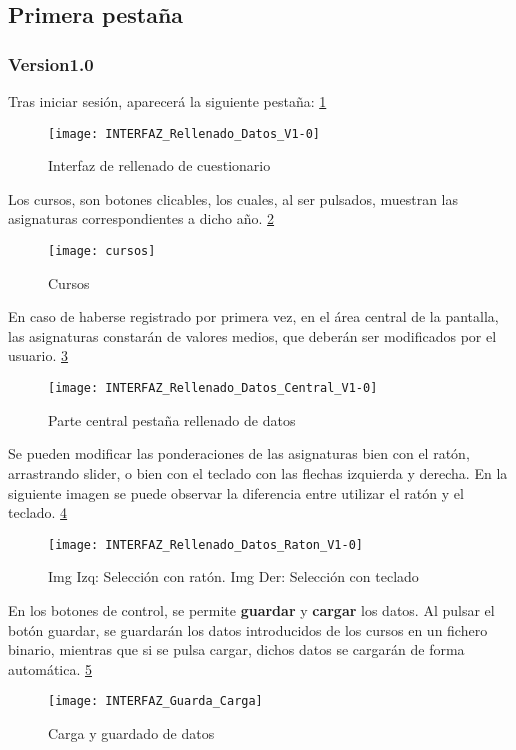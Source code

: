 \subsection{Primera pestaña}
\subsubsection{Version1.0}
Tras iniciar sesión, aparecerá la siguiente pestaña: \ref{fig:E.2.1}
\begin{figure}[h]
\centering
\texttt{[image: INTERFAZ\_Rellenado\_Datos\_V1-0]}
\caption{Interfaz de rellenado de cuestionario}
\label{fig:E.2.1}
\end{figure}
Los cursos, son botones clicables, los cuales, al ser pulsados, muestran las asignaturas correspondientes a dicho año. \ref{fig:E.2.2}
\begin{figure}[h]
\centering
\texttt{[image: cursos]}
\caption{Cursos}
\label{fig:E.2.2}
\end{figure}

En caso de haberse registrado por primera vez, en el área central de la pantalla, las asignaturas constarán de valores medios, que deberán ser modificados por el usuario. \ref{fig:E.2.3}
\begin{figure}[h]
\centering
\texttt{[image: INTERFAZ\_Rellenado\_Datos\_Central\_V1-0]}
\caption{Parte central pestaña rellenado de datos}
\label{fig:E.2.3}
\end{figure}
Se pueden modificar las ponderaciones de las asignaturas bien con el ratón, arrastrando  slider, o bien con el teclado con las flechas izquierda y derecha. En la siguiente imagen se puede observar la diferencia entre utilizar el ratón y el teclado. \ref{fig:E.2.4}
\begin{figure}[h]
\centering
\texttt{[image: INTERFAZ\_Rellenado\_Datos\_Raton\_V1-0]}
\caption{Img Izq: Selección con ratón. Img Der: Selección con teclado}
\label{fig:E.2.4}
\end{figure}

En los botones de control, se permite \textbf{guardar} y \textbf{cargar} los datos. Al pulsar el botón guardar, se guardarán los datos introducidos de los cursos en un fichero binario, mientras que si se pulsa cargar, dichos datos se cargarán de forma automática. \ref{fig:E.2.5}
\begin{figure}[h]
\centering
\texttt{[image: INTERFAZ\_Guarda\_Carga]}
\caption{Carga y guardado de datos}
\label{fig:E.2.5}
\end{figure}


